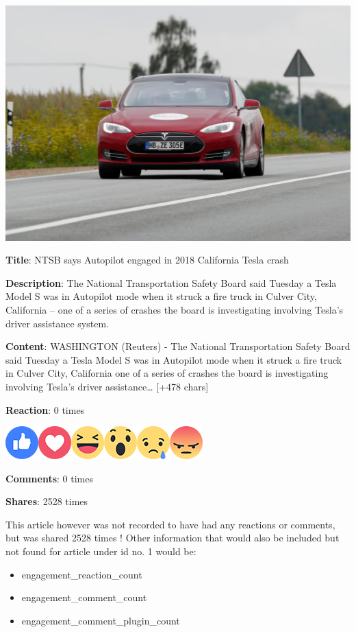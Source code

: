 \documentclass[
]{article}
\providecommand{\tightlist}{%
  \setlength{\itemsep}{0pt}\setlength{\parskip}{0pt}}
\begin{document}
\includegraphics{car.png}

\textbf{Title}: NTSB says Autopilot engaged in 2018 California Tesla
crash

\textbf{Description}: The National Transportation Safety Board said
Tuesday a Tesla Model S was in Autopilot mode when it struck a fire
truck in Culver City, California -- one of a series of crashes the board
is investigating involving Tesla's driver assistance system.

\textbf{Content}: WASHINGTON (Reuters) - The National Transportation
Safety Board said Tuesday a Tesla Model S was in Autopilot mode when it
struck a fire truck in Culver City, California one of a series of
crashes the board is investigating involving Tesla's driver
assistance\ldots{} {[}+478 chars{]}

\textbf{Reaction}: 0 times

\includegraphics{facebook-reactions.png}

\textbf{Comments}: 0 times

\textbf{Shares}: 2528 times

This article however was not recorded to have had any reactions or
comments, but was shared 2528 times ! Other information that would also
be included but not found for article under id no. 1 would be:

\begin{itemize}
\tightlist
\item
  engagement\_reaction\_count
\item
  engagement\_comment\_count
\item
  engagement\_comment\_plugin\_count
\end{itemize}
\end{document}
